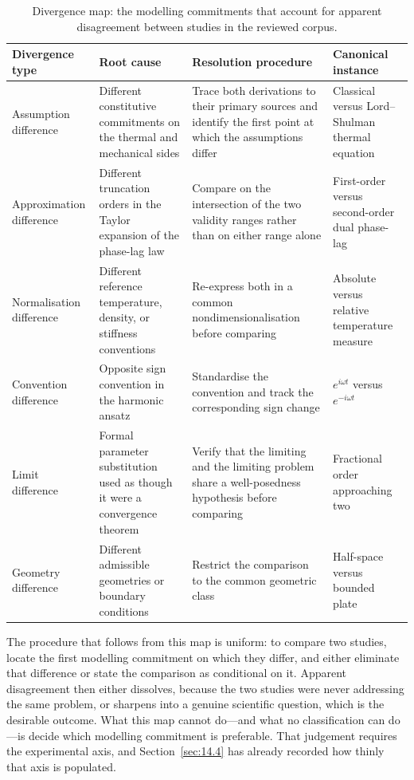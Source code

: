 \begin{table}[h]
\centering
\small
\caption{Divergence map: the modelling commitments that account for apparent disagreement between studies in the reviewed corpus.}
\label{tab:contradiction_map}
\begin{tabularx}{\textwidth}{@{}lXXl@{}}
\toprule
\textbf{Divergence type} & \textbf{Root cause} & \textbf{Resolution procedure} & \textbf{Canonical instance} \\
\midrule
Assumption difference & Different constitutive commitments on the thermal and mechanical sides & Trace both derivations to their primary sources and identify the first point at which the assumptions differ & Classical versus Lord--Shulman thermal equation \\
Approximation difference & Different truncation orders in the Taylor expansion of the phase-lag law & Compare on the intersection of the two validity ranges rather than on either range alone & First-order versus second-order dual phase-lag \\
Normalisation difference & Different reference temperature, density, or stiffness conventions & Re-express both in a common nondimensionalisation before comparing & Absolute versus relative temperature measure \\
Convention difference & Opposite sign convention in the harmonic ansatz & Standardise the convention and track the corresponding sign change & $e^{i\omega t}$ versus $e^{-i\omega t}$ \\
Limit difference & Formal parameter substitution used as though it were a convergence theorem & Verify that the limiting and the limiting problem share a well-posedness hypothesis before comparing & Fractional order approaching two \\
Geometry difference & Different admissible geometries or boundary conditions & Restrict the comparison to the common geometric class & Half-space versus bounded plate \\
\bottomrule
\end{tabularx}
\end{table}

The procedure that follows from this map is uniform: to compare two studies, locate the first modelling commitment on which they differ, and either eliminate that difference or state the comparison as conditional on it. Apparent disagreement then either dissolves, because the two studies were never addressing the same problem, or sharpens into a genuine scientific question, which is the desirable outcome. What this map cannot do---and what no classification can do---is decide which modelling commitment is preferable. That judgement requires the experimental axis, and Section~\ref{sec:14.4} has already recorded how thinly that axis is populated.

